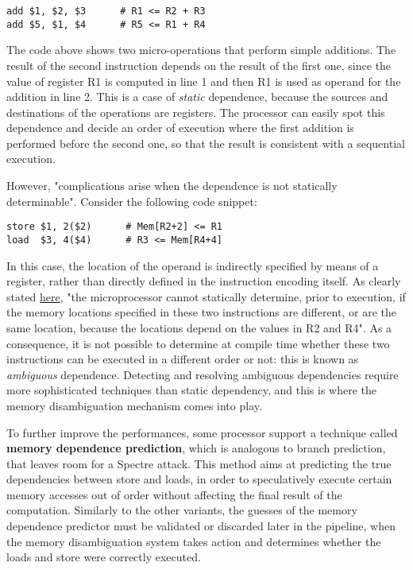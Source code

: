 \documentclass[12pt,a4paper]{book}
\theoremstyle{definition}
\begin{document}
	\vspace{3mm}
	\begin{minipage}{.5\textwidth}
		\begin{lstlisting}
add $1, $2, $3      # R1 <= R2 + R3
add $5, $1, $4      # R5 <= R1 + R4
		\end{lstlisting}
	\end{minipage}
	
	The code above shows two micro-operations that perform simple additions. The result of the second instruction depends on the result of the first one, since the value of register R1 is computed in line 1 and then R1 is used as operand for the addition in line 2. This is a case of \textit{static} dependence, because the sources and destinations of the operations are registers. The processor can easily spot this dependence and decide an order of execution where the first addition is performed before the second one, so that the result is consistent with a sequential execution.
	
	However, "complications arise when the dependence is not statically determinable". Consider the following code snippet:
	
	\vspace{3mm}
	\begin{minipage}{.5\textwidth}
		\begin{lstlisting}
store $1, 2($2)      # Mem[R2+2] <= R1
load  $3, 4($4)      # R3 <= Mem[R4+4]
		\end{lstlisting}
	\end{minipage}
	
	In this case, the location of the operand is indirectly specified by means of a register, rather than directly defined in the instruction encoding itself. As clearly stated \href{https://en.wikipedia.org/wiki/Memory_disambiguation}{here}, "the microprocessor cannot statically determine, prior to execution, if the memory locations specified in these two instructions are different, or are the same location, because the locations depend on the values in R2 and R4". As a consequence, it is not possible to determine at compile time whether these two instructions can be executed in a different order or not: this is known as \textit{ambiguous} dependence. Detecting and resolving ambiguous dependencies require more sophisticated techniques than static dependency, and this is where the memory disambiguation mechanism comes into play.
	
	To further improve the performances, some processor support a technique called \textbf{memory dependence prediction}, which is analogous to branch prediction, that leaves room for a Spectre attack. This method aims at predicting the true dependencies between store and loads, in order to speculatively execute certain memory accesses out of order without affecting the final result of the computation. Similarly to the other variants, the guesses of the memory dependence predictor must be validated or discarded later in the pipeline, when the memory disambiguation system takes action and determines whether the loads and store were correctly executed.
\end{document}
